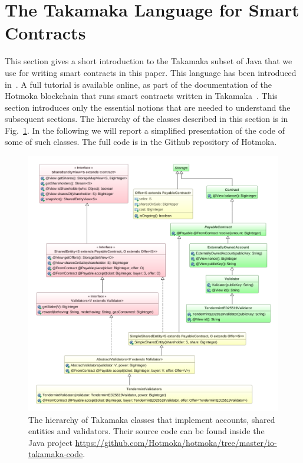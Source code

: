 \section{The Takamaka Language for Smart Contracts}\label{sec:takamaka}

This section gives a short introduction to the Takamaka subset of
Java that we use for writing smart contracts in this paper.
This language has been introduced in~\cite{Spoto19}. A full tutorial
is available online, as part of the documentation of the Hotmoka
blockchain that runs smart contracts written
in Takamaka~\cite{hotmoka_repository}. This section introduces only
the essential notions that are needed to understand the subsequent sections.
The hierarchy of the classes described in this section is in Fig.~\ref{fig:hierarchy-entities}.
In the following we will report a simplified presentation of the code of some
of such classes. The full code is in the Github repository of Hotmoka.

\begin{figure}[t]
  \begin{center}
    \includegraphics[width=12.2cm]{entities-hierarchy.png}
  \end{center}
  \caption{The hierarchy of Takamaka classes that implement accounts, shared entities and validators. Their source code can be found inside the Java project \textsf{\url{https://github.com/Hotmoka/hotmoka/tree/master/io-takamaka-code}}.}\label{fig:hierarchy-entities}
\end{figure}

